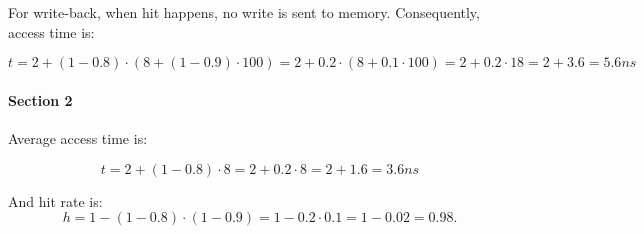 For write-back, when hit happens, no write is sent to memory.
Consequently, access time is:

\[
t= 2 + (1 - 0.8) \cdot (8 + (1-0.9) \cdot 100) =
2 + 0.2 \cdot (8 + 0.1 \cdot 100) =
2 + 0.2 \cdot 18 = 
2 + 3.6 = 5.6 ns
\]

\paragraph{Section 2}

Average access time is:

\[
t = 2 + (1 - 0.8) \cdot 8 =
2 + 0.2 \cdot 8 =
2 + 1.6 =
3.6 ns
\]

And hit rate is:
\[
h =
1 - (1-0.8) \cdot (1-0.9) =
1-0.2 \cdot 0.1 = 
1 - 0.02 =
0.98.
\]

